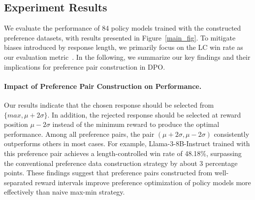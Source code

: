 


\subsection{Experiment Results}
We evaluate the performance of 84 policy models trained with the constructed preference datasets, with results presented in Figure~\ref{main_fig}. 
To mitigate biases introduced by response length, we primarily focus on the LC win rate as our evaluation metric~\cite{dubois2024lengthcontrolled}. 
In the following, we summarize our key findings and their implications for preference pair construction in DPO.  



\paragraph{Impact of Preference Pair Construction on Performance.}
Our results indicate that the chosen response should be selected from \(\{max, \mu+2\sigma\}\).
In addition, the rejected response should be selected at reward position \(\mu-2\sigma\) instead of the minimum reward to produce the optimal performance.  
Among all preference pairs, the pair \((\mu+2\sigma, \mu-2\sigma)\) consistently outperforms others in most cases. 
For example, Llama-3-8B-Instruct trained with this preference pair achieves a length-controlled win rate of 48.18\%, surpassing the conventional preference data construction strategy by about 3 percentage points. 
These findings suggest that preference pairs constructed from well-separated reward intervals improve preference optimization of policy models more effectively than naive max-min strategy.  


